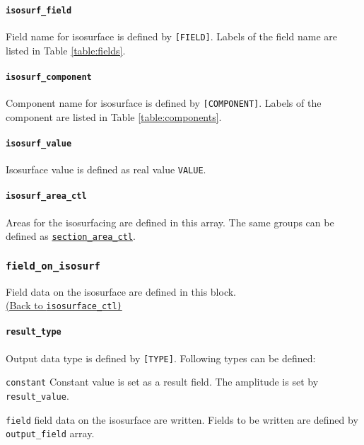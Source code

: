 \paragraph{\tt isosurf\_field}
\label{href_t:isosurf_field}
Field name for isosurface is defined by \verb|[FIELD]|. Labels of the field name are listed in Table \ref{table:fields}. \\
%
\paragraph{\tt isosurf\_component}
\label{href_t:isosurf_component}
Component name for isosurface is defined by \verb|[COMPONENT]|. Labels of the component are listed in Table \ref{table:components}.

%
\paragraph{\tt isosurf\_value}
\label{href_t:isosurf_value}
Isosurface value is defined as real value \verb|VALUE|.

\paragraph{\tt isosurf\_area\_ctl}
\label{href_t:isosurf_area_ctl}
Areas for the isosurfacing are defined in this array. The same groups can be defined as \hyperref[href_t:psf_output_field]{\tt section\_area\_ctl}.

%
\subsubsection{\tt field\_on\_isosurf}
\label{href_t:field_on_isosurf}
Field data on the isosurface are defined in this block. \\
\hyperref[href_i:isosurface_ctl]{(Back to {\tt isosurface\_ctl)}}

%
\paragraph{\tt result\_type}
\label{href_t:result_type}
Output data type is defined by \verb|[TYPE]|. Following types can be defined:
%
\begin{description}
	\item{\tt constant} Constant value is set as a result field. The amplitude is set by \verb|result_value|.
	\item{\tt field} field data on the isosurface are written. Fields to be written are defined by \verb|output_field| array.
\end{description}

